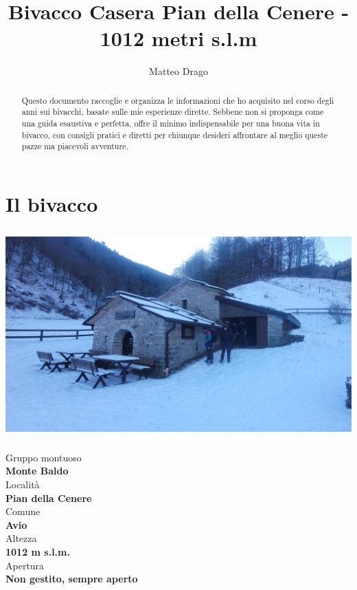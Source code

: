 \documentclass{article}
\title{\textbf{Bivacco Casera Pian della Cenere - 1012 metri s.l.m}}
\author{Matteo Drago}
\begin{document}
\maketitle
\thispagestyle{fancy} %

\begin{abstract}
Questo documento raccoglie e organizza le informazioni che ho acquisito nel corso degli anni sui bivacchi, basate sulle mie esperienze dirette. Sebbene non si proponga come una guida esaustiva e perfetta, offre il minimo indispensabile per una buona vita in bivacco, con consigli pratici e diretti per chiunque desideri affrontare al meglio queste pazze ma piacevoli avventure.
\end{abstract}

\section{Il bivacco}

\noindent
\begin{minipage}[t]{0.45\textwidth}
  \vspace{0pt} %
\includegraphics[width=\linewidth,height=8cm,keepaspectratio]{images/bivacco.jpg}
\end{minipage}%
\hfill
\begin{minipage}[t]{0.5\textwidth}
  \vspace{0pt} %
  
  Gruppo montuoso\\
  \textbf{\large Monte Baldo}
  \\[1em] %
  Località\\
  \textbf{\large Pian della Cenere}
  \\[1em] %
  Comune\\  
  \textbf{\large Avio}
  \\[1em] %
  Altezza\\  
  \textbf{\large 1012 m s.l.m.}
  \\[1em] %
  Apertura\\  
  \textbf{\large Non gestito, sempre aperto}

\end{minipage}
\end{document}
